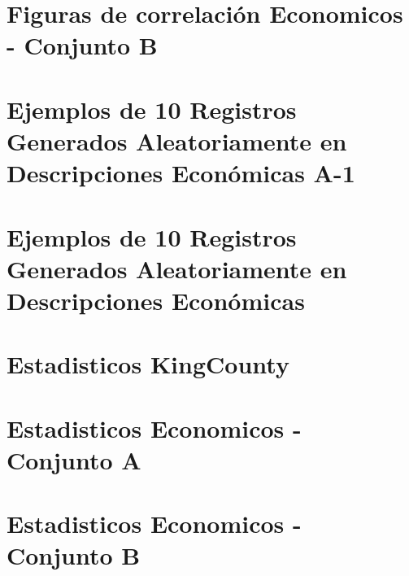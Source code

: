 \section{Figuras de correlación Economicos - Conjunto B}
\label{pairwise-full-a}


%

\section{Ejemplos de 10 Registros Generados Aleatoriamente en Descripciones Económicas A-1}
\label{ejemplo-10-aleatoreos-a}


\section{Ejemplos de 10 Registros Generados Aleatoriamente en Descripciones Económicas}
\label{ejemplo-10-aleatoreos-b}


\section{Estadisticos KingCounty}
\label{propiedades-estadisticas-kingCounty}


\section{Estadisticos Economicos - Conjunto A}
\label{propiedades-estadisticas-economicos-A}



\section{Estadisticos Economicos - Conjunto B}
\label{propiedades-estadisticas-economicos-B}

